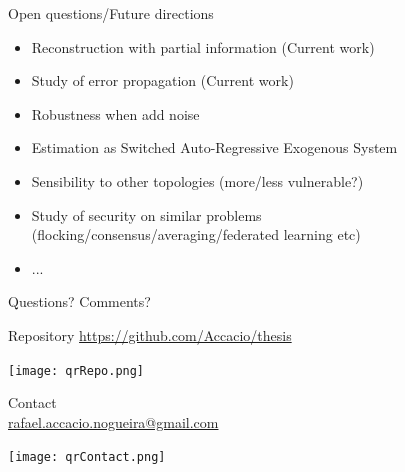 \documentclass[aspectratio=169]{beamer}
\begin{document}
\begin{frame}{Open questions/Future directions}
    \begin{itemize}[<+->]
      \item Reconstruction with partial information (Current work)
      \item Study of error propagation (Current work)
      \item Robustness when add noise
      \item Estimation as Switched Auto-Regressive Exogenous System
      \item Sensibility to other topologies (more/less vulnerable?)
      \item Study of security on similar problems (flocking/consensus/averaging/federated learning etc)
      \item ...
    \end{itemize}
\end{frame}




\appendix

\begin{frame}[plain]
  \centering
  \vfill
  Questions? Comments?
  \vfill
  \begin{minipage}[t]{.45\linewidth}
    \small
    \centering
    Repository
    \href{https://github.com/Accacio/thesis}{https://github.com/Accacio/thesis}

    \texttt{[image: qrRepo.png]}
  \end{minipage}
  \hfill
  \begin{minipage}[t]{.5\linewidth}
    \small
    \centering
    Contact\\
    \href{mailto:rafael.accacio.nogueira@gmail.com?subject=Seminar Lyon 2023}{rafael.accacio.nogueira@gmail.com}

    \texttt{[image: qrContact.png]}
  \end{minipage}
  \fi

\end{frame}
\end{document}
